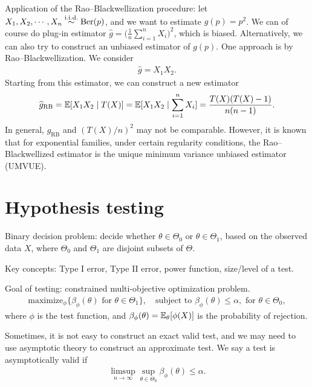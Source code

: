 \documentclass[11pt,letterpaper]{article}
\numberwithin{assumption}{lecture}
\numberwithin{theorem}{lecture}
\numberwithin{proposition}{lecture}
\numberwithin{lemma}{lecture}
\numberwithin{claim}{lecture}
\numberwithin{corollary}{lecture}
\numberwithin{definition}{lecture}
\numberwithin{conjecture}{lecture}
\numberwithin{remark}{lecture}
\numberwithin{example}{lecture}
\numberwithin{equation}{lecture}
\begin{document}
Application of the Rao--Blackwellization procedure: let $X_1, X_2, \cdots, X_n \overset{\mathrm{i.i.d.}}{\sim} \mathrm{Ber} (p)$, and we want to estimate $g (p) = p^2$. We can of course do plug-in estimator $\widehat{g} = \big( \frac{1}{n} \sum_{i=1}^n X_i \big)^2$, which is biased. Alternatively, we can also try to construct an unbiased estimator of $g(p)$. One approach is by Rao--Blackwellization. We consider
\begin{align*}
  \widehat{g} = X_1 X_2.
\end{align*}
Starting from this estimator, we can construct a new estimator
\begin{align*}
  \widehat{g}_{\mathrm{RB}} = {\mathbb{E}} [X_1 X_2 \mid T(X)] = {\mathbb{E}} [X_1 X_2 \mid \sum_{i=1}^n X_i] = \frac{T(X) (T(X) - 1)}{n (n - 1)}.
\end{align*}
In general, $\widehat{g}_{\mathrm{RB}}$ and $(T(X)/n)^2$ may not be comparable. However, it is known that for exponential families, under certain regularity conditions, the Rao--Blackwellized estimator is the unique minimum variance unbiased estimator (UMVUE).

\section{Hypothesis testing}
Binary decision problem: decide whether $\theta \in \Theta_0$ or $\theta \in \Theta_1$, based on the observed data $X$, where $\Theta_0$ and $\Theta_1$ are disjoint subsets of $\Theta$.

Key concepts:
Type I error, Type II error, power function, size/level of a test.

Goal of testing: constrained multi-objective optimization problem.
\begin{align*}
  \mathrm{maximize}_\phi \Big\{ \beta_\phi (\theta) \mbox{ for } \theta \in \Theta_1  \Big\}, \quad \text{subject to } \beta_\phi (\theta) \leq \alpha, \mbox{ for } \theta \in \Theta_0,
\end{align*}
where $\phi$ is the test function, and $\beta_\phi (\theta) = {\mathbb{E}}_\theta [\phi (X)]$ is the probability of rejection.

Sometimes, it is not easy to construct an exact valid test, and we may need to use asymptotic theory to construct an approximate test. We say a test is asymptotically valid if
\begin{align*}
  \limsup_{n \to \infty} \sup_{\theta \in \Theta_0} \beta_\phi (\theta) \leq \alpha.
\end{align*}
\end{document}
